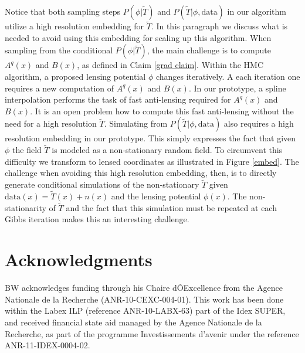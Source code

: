 \documentclass[noinfoline]{imsart}
\begin{document}
Notice that both sampling steps $P(\phi |\widetilde T)$ and $P(\widetilde T|\phi, \text{data})$ in our algorithm utilize a high resolution embedding for $\widetilde T$. In this paragraph we discuss what is needed to avoid using this embedding for scaling up this algorithm. When sampling from the conditional $P(\phi |\widetilde T)$, the main challenge is to compute $A^q(x)$ and $B(x)$, as defined in Claim  \ref{grad claim}.  Within the HMC algorithm, a proposed lensing potential $\phi$ changes iteratively. A each iteration  one requires a new computation of $A^q(x)$ and $B(x)$. In our prototype, a spline interpolation performs the task of fast anti-lensing required for  $A^q(x)$ and $B(x)$. It is an open problem how to compute this fast anti-lensing without the need for a high resolution $\widetilde T$. Simulating from $P(\widetilde T|\phi, \text{data})$ also requires a high resolution embedding in our prototype. This simply expresses the fact that given $\phi$ the field $\widetilde T$ is modeled as a non-stationary random field. To circumvent this difficulty we  transform to lensed coordinates as illustrated in Figure \ref{embed}. The challenge when avoiding this high resolution embedding, then, is to directly generate conditional simulations of the non-stationary $\widetilde T$ given $\text{data}(x)=\widetilde T(x)+ n(x)$ and the lensing potential $\phi(x)$. The non-stationarity of $\widetilde T$ and the fact that this simulation must be repeated at each Gibbs iteration makes this an interesting challenge.

%
%

\section*{Acknowledgments}
BW acknowledges funding through his Chaire dÕExcellence from the Agence Nationale
de la Recherche (ANR-10-CEXC-004-01). This work has been done within the Labex ILP (reference ANR-10-LABX-63) part of the Idex SUPER, and received financial state aid managed by the Agence Nationale de la Recherche, as part of the programme Investissements d'avenir under the reference ANR-11-IDEX-0004-02.





%
%
\appendix

\section{}
\end{document}
